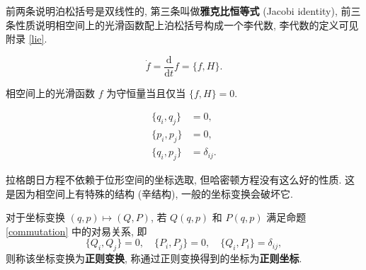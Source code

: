 前两条说明泊松括号是双线性的, 第三条叫做{\bf 雅克比恒等式} (Jacobi identity), 前三条性质说明相空间上的光滑函数配上泊松括号构成一个李代数, 李代数的定义可见附录 \ref{lie}.

\begin{proposition}\keepline
    \[ \dot{f}=\frac{\mathrm{d}}{\mathrm{d}t}f=\{f,H\}. \]
\end{proposition}
\vspace{0ex}
\begin{corollary}
    相空间上的光滑函数 $ f $ 为守恒量当且仅当 $ \{f,H\}=0$.
\end{corollary}
\vspace{0ex}
\begin{proposition}\keepline
    \label{commutation}
    \[\begin{aligned}
        \{q_i,q_j\} &= 0,\\ 
        \{p_i,p_j\} &= 0,\\ 
        \{q_i,p_j\} &= \delta_{ij}.
    \end{aligned}\]
\end{proposition}
\vspace{0ex}
拉格朗日方程不依赖于位形空间的坐标选取, 但哈密顿方程没有这么好的性质. 这是因为相空间上有特殊的结构 (辛结构), 一般的坐标变换会破坏它.

\begin{definition}
    对于坐标变换 $ (q,p)\mapsto(Q,P) $, 若 $ Q(q,p) $ 和 $ P(q,p) $ 满足命题 \ref{commutation} 中的对易关系, 即
    \[ \{Q_i,Q_j\}=0,\quad\{P_i,P_j\}=0,\quad\{Q_i,P_i\}=\delta_{ij}, \]
    则称该坐标变换为{\bf 正则变换}, 称通过正则变换得到的坐标为{\bf 正则坐标}.
\end{definition}

